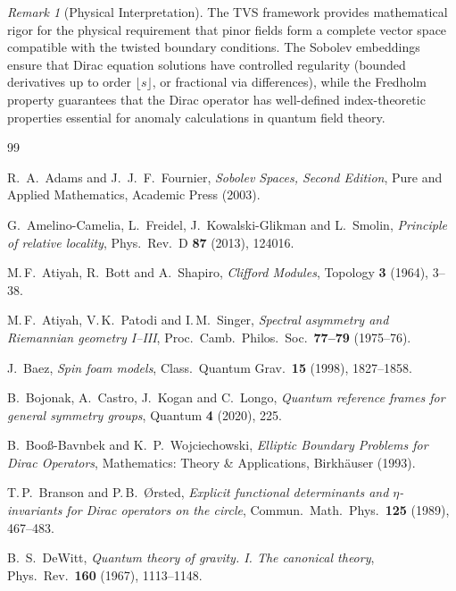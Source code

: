 \documentclass[11pt]{amsart}
\theoremstyle{definition}
\theoremstyle{remark}
\newtheorem{remark}[theorem]{Remark}
\begin{document}
\begin{remark}[Physical Interpretation]
The TVS framework provides mathematical rigor for the physical requirement that pinor fields form a complete vector space compatible with the twisted boundary conditions. The Sobolev embeddings ensure that Dirac equation solutions have controlled regularity (bounded derivatives up to order $\lfloor s \rfloor$, or fractional via differences), while the Fredholm property guarantees that the Dirac operator has well-defined index-theoretic properties essential for anomaly calculations in quantum field theory.
\end{remark}

\begin{thebibliography}{99}

R.~A.~Adams and J.~J.~F.~Fournier,
\textit{Sobolev Spaces, Second Edition},
Pure and Applied Mathematics, Academic Press (2003).

G.~Amelino-Camelia, L.~Freidel, J.~Kowalski-Glikman and L.~Smolin,
\textit{Principle of relative locality},
Phys.\ Rev.\ D \textbf{87} (2013), 124016.

M.\,F.~Atiyah, R.~Bott and A.~Shapiro,
\textit{Clifford Modules},
Topology \textbf{3} (1964), 3–38.

M.\,F.~Atiyah, V.\,K.~Patodi and I.\,M.~Singer,
\textit{Spectral asymmetry and Riemannian geometry I–III},
Proc.\ Camb.\ Philos.\ Soc.\ \textbf{77–79} (1975–76).

J.~Baez,
\textit{Spin foam models},
Class.\ Quantum Grav.\ \textbf{15} (1998), 1827–1858.

B.~Bojonak, A.~Castro, J.~Kogan and C.~Longo,
\textit{Quantum reference frames for general symmetry groups},
Quantum \textbf{4} (2020), 225.

B.~Booß-Bavnbek and K.~P.~Wojciechowski,
\textit{Elliptic Boundary Problems for Dirac Operators},
Mathematics: Theory \& Applications, Birkhäuser (1993).

T.\,P.~Branson and P.\,B.~Ørsted,
\textit{Explicit functional determinants and $\eta$-invariants for Dirac operators on the circle},
Commun.\ Math.\ Phys.\ \textbf{125} (1989), 467–483.

B.~S.~DeWitt,
\textit{Quantum theory of gravity. I. The canonical theory},
Phys.\ Rev.\ \textbf{160} (1967), 1113–1148.


\end{thebibliography}
\end{document}
